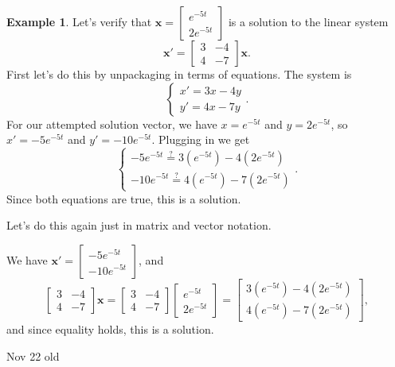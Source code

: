 \documentclass[12pt]{amsart}
\numberwithin{equation}{section}
\theoremstyle{plain} %
\newcommand{\Nov}[1]{Nov #1 old}
\theoremstyle{definition}
\newtheorem{ex}[equation]{Example}
\theoremstyle{remark}
\begin{document}
\begin{ex} Let's verify that $\mathbf{x} = \begin{bmatrix} e^{-5t} \\ 2 e^{-5t} \end{bmatrix}$ is a solution to the linear system
\[ \mathbf{x'} = \begin{bmatrix} 3 & -4 \\ 4 & -7 \end{bmatrix} \mathbf{x}.\]
First let's do this by unpackaging in terms of equations. The system is
\[ \begin{cases} x' = 3x - 4y \\ y' =4x-7y  \end{cases}.\]
For our attempted solution vector, we have $x=  e^{-5t}$ and $y=2 e^{-5t}$, so $x' = -5 e^{-5t}$ and $y'=-10 e^{-5t}$. Plugging in we get
\[ \begin{cases} -5 e^{-5t} \stackrel{?}{=} 3 (e^{-5t}) - 4 (2 e^{-5t})  \\ -10 e^{-5t} \stackrel{?}{=}  4 (e^{-5t}) - 7 (2 e^{-5t}) \end{cases}.\]
Since both equations are true, this is a solution.

Let's do this again just in matrix and vector notation.
 
We have $\mathbf{x'} =  \begin{bmatrix} -5 e^{-5t} \\ -10 e^{-5t} \end{bmatrix}$, and 
\[ \begin{bmatrix} 3 & -4 \\ 4 & -7 \end{bmatrix} \mathbf{x} = \begin{bmatrix} 3 & -4 \\ 4 & -7 \end{bmatrix}  \begin{bmatrix} e^{-5t} \\ 2 e^{-5t} \end{bmatrix} = \begin{bmatrix} 3 (e^{-5t}) - 4 (2 e^{-5t}) \\ 4 (e^{-5t}) - 7 (2 e^{-5t}) \end{bmatrix} ,\]
and since equality holds, this is a solution.
\end{ex}


\Nov{22}
\end{document}
